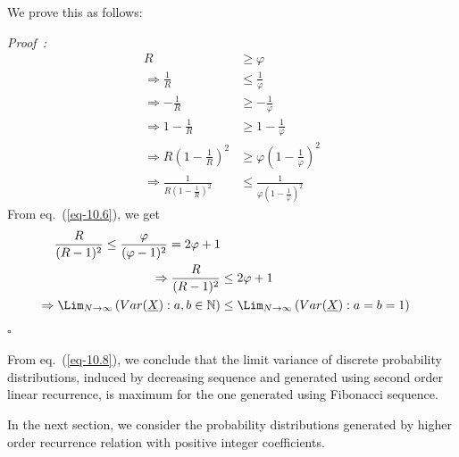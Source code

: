 \begin{multicols}{2}
\vspace{-.7cm}

We prove this as follows:

\vspace{-.3cm}

{\it Proof~:}
\begin{align}
 R &\ge \varphi\nonumber\\
 \Rightarrow \frac{1}{R} &\le \frac{1}{\varphi}\nonumber\\
\Rightarrow -\frac{1}{R} &\ge - \frac{1}{\varphi}\nonumber\\
\Rightarrow 1-\frac{1}{R} &\ge 1 - \frac{1}{\varphi}\nonumber\\
\Rightarrow R\left(1-\frac{1}{R}\right)^2 &\ge \varphi\left(1 - \frac{1}{\varphi}\right)^2\nonumber\\
\Rightarrow \frac{1}{R\left(1-\frac{1}{R}\right)^2} &\le \frac{1}{\varphi\left(1 - \frac{1}{\varphi}\right)^2}\label{eq-10.6}
\end{align}
From eq.~(\ref{eq-10.6}), we get 
{\fontsize{8}{9}\selectfont\begin{align}
\frac{R}{(R-1)^2} \le \frac{\varphi}{(\varphi-1)^2} = 2\varphi + 1\nonumber\\
\Rightarrow \frac{R}{(R-1)^2} &\le 2\varphi + 1\label{eq-10.7}\\
\Rightarrow \Lim_{N\rightarrow \infty} \left(Var(\underline{X}):a,b\in \mathbb N\right) &\leq \Lim_{N\rightarrow \infty}\left(Var(\underline{X}): a = b = 1\right)\label{eq-10.8}
\end{align}}
\hfill{$\square$}

\vspace{-.4cm}

From eq.~(\ref{eq-10.8}), we conclude that the limit variance of discrete probability distributions, induced by decreasing sequence and generated using second order linear recurrence, is maximum for the one generated using Fibonacci sequence.

In the next section, we consider the probability distributions generated by higher order recurrence relation with positive integer coefficients.


\end{multicols}
